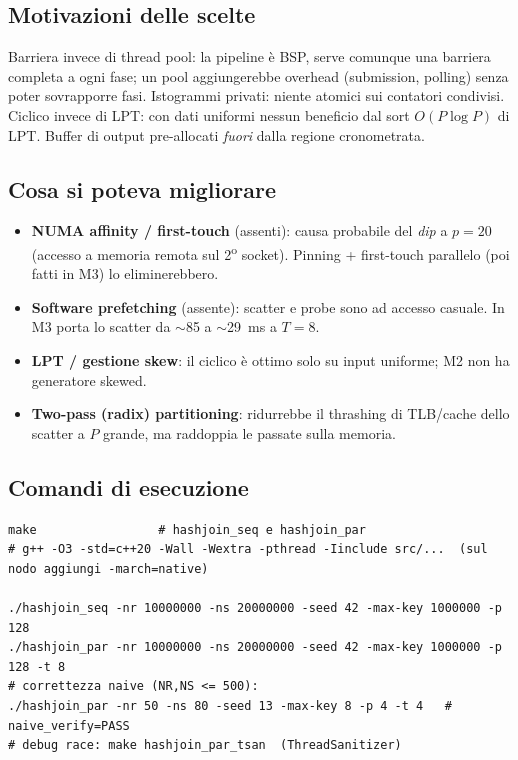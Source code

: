 \documentclass[11pt,a4paper]{article}
\begin{document}
\subsection{Motivazioni delle scelte}

Barriera invece di thread pool: la pipeline è BSP, serve comunque una barriera completa a ogni fase; un pool aggiungerebbe overhead (submission, polling) senza poter sovrapporre fasi. Istogrammi privati: niente atomici sui contatori condivisi. Ciclico invece di LPT: con dati uniformi nessun beneficio dal sort $O(P\log P)$ di LPT. Buffer di output pre-allocati \emph{fuori} dalla regione cronometrata.

\subsection{Cosa si poteva migliorare}

\begin{itemize}
  \item \textbf{NUMA affinity / first-touch} (assenti): causa probabile del \emph{dip} a $p=20$ (accesso a memoria remota sul 2\textsuperscript{o} socket). Pinning + first-touch parallelo (poi fatti in M3) lo eliminerebbero.
  \item \textbf{Software prefetching} (assente): scatter e probe sono ad accesso casuale. In M3 porta lo scatter da $\sim$85 a $\sim$29~ms a $T=8$.
  \item \textbf{LPT / gestione skew}: il ciclico è ottimo solo su input uniforme; M2 non ha generatore skewed.
  \item \textbf{Two-pass (radix) partitioning}: ridurrebbe il thrashing di TLB/cache dello scatter a $P$ grande, ma raddoppia le passate sulla memoria.
\end{itemize}

\subsection{Comandi di esecuzione}

\begin{lstlisting}[style=bash, caption={Build ed esecuzione (flag CLI: -nr -ns -seed -max-key -p -t).}]
make                 # hashjoin_seq e hashjoin_par
# g++ -O3 -std=c++20 -Wall -Wextra -pthread -Iinclude src/...  (sul nodo aggiungi -march=native)

./hashjoin_seq -nr 10000000 -ns 20000000 -seed 42 -max-key 1000000 -p 128
./hashjoin_par -nr 10000000 -ns 20000000 -seed 42 -max-key 1000000 -p 128 -t 8
# correttezza naive (NR,NS <= 500):
./hashjoin_par -nr 50 -ns 80 -seed 13 -max-key 8 -p 4 -t 4   # naive_verify=PASS
# debug race: make hashjoin_par_tsan  (ThreadSanitizer)
\end{lstlisting}
\end{document}

